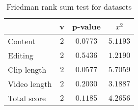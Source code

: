 \begin{table}[ht]
	\begin{center}
	\caption{Friedman rank sum test for datasets}
	\label{tab:fried_dataset}
		\begin{tabular}{lccc}
		\toprule
			 & v & p-value & $x^2$\\
			\midrule
			Content & $2$ & $0.0773$ & $5.1193$\\
			Editing & $2$ & $0.5436$ & $1.2190$\\
			Clip length & $2$ & $0.0577$ & $5.7059$\\
			Video length & $2$ & $0.2030$ & $3.1887$\\
			Total score & $2$ & $0.1185$ & $4.2656$\\
		\bottomrule
		\end{tabular}
	\end{center}
\end{table}